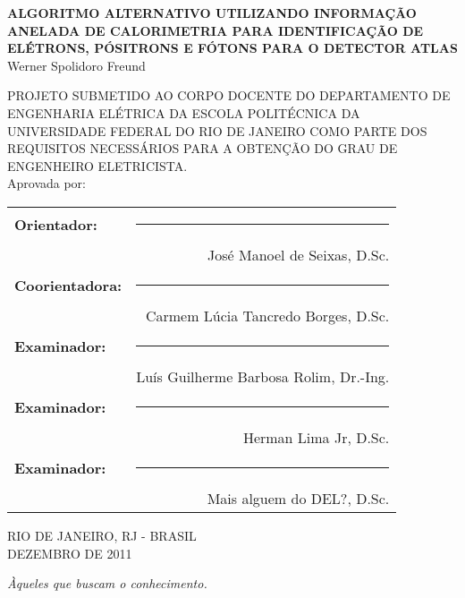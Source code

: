 \begin{titlepage}
	\begin{center}
		{\large \uppercase{\bf{Algoritmo Alternativo utilizando informação anelada
de calorimetria para identificação de elétrons, pósitrons e fótons para 
o detector ATLAS}}}\\[0.9cm]
    {Werner Spolidoro Freund}\\[0.9cm]
  \end{center}

		{\uppercase{\footnotesize{PROJETO SUBMETIDO AO CORPO DOCENTE DO DEPARTAMENTO 
DE ENGENHARIA ELÉTRICA DA ESCOLA POLITÉCNICA DA UNIVERSIDADE FEDERAL DO RIO 
DE JANEIRO COMO PARTE DOS REQUISITOS NECESSÁRIOS PARA A OBTENÇÃO DO GRAU 
DE ENGENHEIRO ELETRICISTA.}}}\\[0.3cm]

    {Aprovada por:}

  \begin{flushright}
		\begin{tabular}{lr}
			{\bf Orientador:} & \rule{8cm}{0.4pt} \\
					 & José Manoel de Seixas, D.Sc. \\[0.5cm]
			{\bf Coorientadora:}& \rule{8cm}{0.4pt} \\ 
					 & Carmem Lúcia Tancredo Borges, D.Sc. \\[0.5cm]
			{\bf Examinador:}& \rule{8cm}{0.4pt} \\
					 & Luís Guilherme Barbosa Rolim, Dr.-Ing. \\[0.5cm]
			{\bf Examinador:}& \rule{8cm}{0.4pt} \\
					 & Herman Lima Jr, D.Sc. \\[0.5cm]
			{\bf Examinador:}& \rule{8cm}{0.4pt} \\
					 & Mais alguem do DEL?, D.Sc. \\[0.5cm]
		\end{tabular}
	\end{flushright}
  \vfill
  \begin{center}
		\begin{large}
      \uppercase{
			RIO DE JANEIRO, RJ - BRASIL \\
      DEZEMBRO DE 2011}
		\end{large}
  \end{center}
\end{titlepage}

\cleardoublepage

\null
\vfill
\begin{flushright}
  \em{Àqueles que buscam o conhecimento.}\\
\end{flushright}
